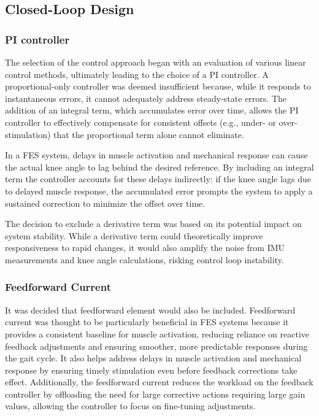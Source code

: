 \subsection{Closed-Loop Design}

\subsubsection{PI controller}
The selection of the control approach began with an evaluation of various linear control methods, ultimately leading to the choice of a PI controller. A proportional-only controller was deemed insufficient because, while it responds to instantaneous errors, it cannot adequately address steady-state errors. The addition of an integral term, which accumulates error over time, allows the PI controller to effectively compensate for consistent offsets (e.g., under- or over-stimulation) that the proportional term alone cannot eliminate.

In a FES system, delays in muscle activation and mechanical response can cause the actual knee angle to lag behind the desired reference. By including an integral term the controller accounts for these delays indirectly: if the knee angle lags due to delayed muscle response, the accumulated error prompts the system to apply a sustained correction to minimize the offset over time.

The decision to exclude a derivative term was based on its potential impact on system stability. While a derivative term could theoretically improve responsiveness to rapid changes, it would also amplify the noise from IMU measurements and knee angle calculations, risking control loop instability.

\subsubsection{Feedforward Current}
It was decided that feedforward element would also be included. Feedforward current was thought to be particularly beneficial in FES systems because it provides a consistent baseline for muscle activation, reducing reliance on reactive feedback adjustments and ensuring smoother, more predictable responses during the gait cycle. It also helps address delays in muscle activation and mechanical response by ensuring timely stimulation even before feedback corrections take effect. Additionally, the feedforward current reduces the workload on the feedback controller by offloading the need for large corrective actions requiring large gain values, allowing the controller to focus on fine-tuning adjustments.

